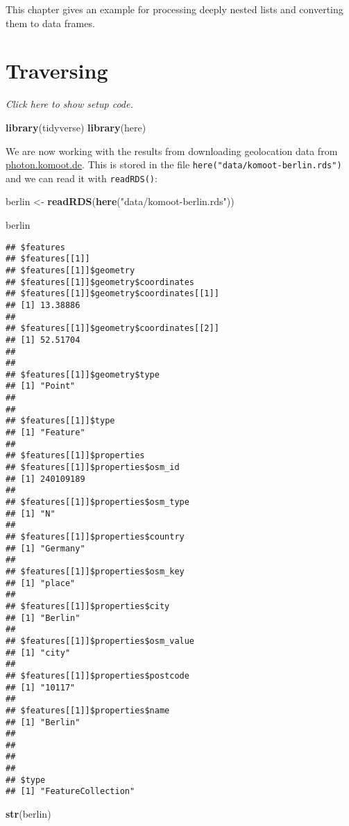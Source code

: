 \documentclass[]{book}
\newenvironment{Shaded}{\begin{snugshade}}{\end{snugshade}}
\newcommand{\KeywordTok}[1]{\textcolor[rgb]{0.13,0.29,0.53}{\textbf{#1}}}
\newcommand{\NormalTok}[1]{#1}
\newcommand{\StringTok}[1]{\textcolor[rgb]{0.31,0.60,0.02}{#1}}
\begin{document}
This chapter gives an example for processing deeply nested lists and converting them to data frames.

\hypertarget{berlin}{%
\section{Traversing}\label{berlin}}

\emph{Click here to show setup code.}

\begin{Shaded}
\begin{Highlighting}[]
\KeywordTok{library}\NormalTok{(tidyverse)}
\KeywordTok{library}\NormalTok{(here)}
\end{Highlighting}
\end{Shaded}

We are now working with the results from downloading geolocation data from \href{http://photon.komoot.de/}{photon.komoot.de}.
This is stored in the file \texttt{here("data/komoot-berlin.rds")} and we can read it with \texttt{readRDS()}:

\begin{Shaded}
\begin{Highlighting}[]
\NormalTok{berlin <-}\StringTok{ }\KeywordTok{readRDS}\NormalTok{(}\KeywordTok{here}\NormalTok{(}\StringTok{"data/komoot-berlin.rds"}\NormalTok{))}

\NormalTok{berlin}
\end{Highlighting}
\end{Shaded}

\begin{verbatim}
## $features
## $features[[1]]
## $features[[1]]$geometry
## $features[[1]]$geometry$coordinates
## $features[[1]]$geometry$coordinates[[1]]
## [1] 13.38886
## 
## $features[[1]]$geometry$coordinates[[2]]
## [1] 52.51704
## 
## 
## $features[[1]]$geometry$type
## [1] "Point"
## 
## 
## $features[[1]]$type
## [1] "Feature"
## 
## $features[[1]]$properties
## $features[[1]]$properties$osm_id
## [1] 240109189
## 
## $features[[1]]$properties$osm_type
## [1] "N"
## 
## $features[[1]]$properties$country
## [1] "Germany"
## 
## $features[[1]]$properties$osm_key
## [1] "place"
## 
## $features[[1]]$properties$city
## [1] "Berlin"
## 
## $features[[1]]$properties$osm_value
## [1] "city"
## 
## $features[[1]]$properties$postcode
## [1] "10117"
## 
## $features[[1]]$properties$name
## [1] "Berlin"
## 
## 
## 
## 
## $type
## [1] "FeatureCollection"
\end{verbatim}

\begin{Shaded}
\begin{Highlighting}[]
\KeywordTok{str}\NormalTok{(berlin)}
\end{Highlighting}
\end{Shaded}
\end{document}
